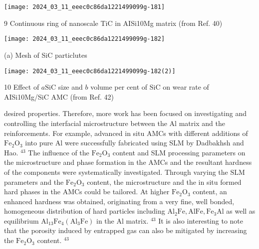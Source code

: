 \documentclass[10pt]{article}
\begin{document}
\begin{center}
\texttt{[image: 2024\_03\_11\_eeec0c86da1221499099g-181]}
\end{center}

9 Continuous ring of nanoscale TiC in AISi10Mg matrix (from Ref. 40)

\begin{center}
\texttt{[image: 2024\_03\_11\_eeec0c86da1221499099g-182]}
\end{center}

(a) Mesh of SiC particlutes

\begin{center}
\texttt{[image: 2024\_03\_11\_eeec0c86da1221499099g-182(2)]}
\end{center}

10 Effect of $a \mathrm{SiC}$ size and $b$ volume per cent of $\mathrm{SiC}$ on wear rate of AISi10Mg/SiC AMC (from Ref. 42)

desired properties. Therefore, more work has been focused on investigating and controlling the interfacial microstructure between the $\mathrm{Al}$ matrix and the reinforcements. For example, advanced in situ AMCs with different additions of $\mathrm{Fe}_{2} \mathrm{O}_{3}$ into pure $\mathrm{Al}$ were successfully fabricated using SLM by Dadbakhsh and Hao. ${ }^{43}$ The influence of the $\mathrm{Fe}_{2} \mathrm{O}_{3}$ content and SLM processing parameters on the microstructure and phase formation in the AMCs and the resultant hardness of the components were systematically investigated. Through varying the $\mathrm{SLM}$ parameters and the $\mathrm{Fe}_{2} \mathrm{O}_{3}$ content, the microstructure and the in situ formed hard phases in the AMCs could be tailored. At higher $\mathrm{Fe}_{2} \mathrm{O}_{3}$ content, an enhanced hardness was obtained, originating from a very fine, well bonded, homogeneous distribution of hard particles including $\mathrm{Al}_{2} \mathrm{Fe}, \mathrm{AlFe}, \mathrm{Fe}_{3} \mathrm{Al}$ as well as equilibrium $\mathrm{Al}_{13} \mathrm{Fe}_{4}\left(\mathrm{Al}_{3} \mathrm{Fe}\right)$ in the $\mathrm{Al}$ matrix. ${ }^{43}$ It is also interesting to note that the porosity induced by entrapped gas can also be mitigated by increasing the $\mathrm{Fe}_{2} \mathrm{O}_{3}$ content. $^{43}$
\end{document}
